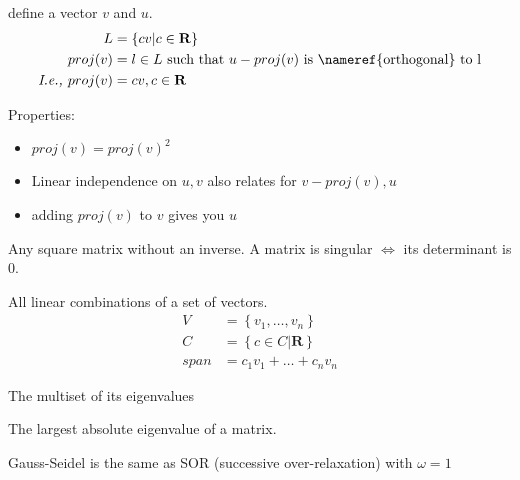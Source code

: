 \begin{definition}[Projection]
    define a vector $v$ and $u$.
    \begin{align*}
        L &= \left\{cv | c \in \mathbf{R} \right\}  \\
        proj(v) &= l \in L \text{\ such that\ } u - proj(v) 
        \text{\ is~\nameref{orthogonal} to l}  \\
        \textit{I.e., } proj(v) &= cv, c \in \mathbf{R}
    \end{align*}

    Properties:
    \begin{itemize}
        \item $proj(v) = proj(v)^{2}$
        \item Linear independence on $u, v$ also relates for $v - proj(v), u$
        \item adding $proj(v)$ to $v$ gives you $u$
    \end{itemize}

\end{definition}

\begin{definition}
    Any square matrix without an inverse.
    A matrix is singular $\iff$ its determinant is 0.

\end{definition}

\begin{definition}\label{vectorspan}
    All linear combinations of a set of vectors.
    \begin{align*}
        V &= \left\{v_{1}, \dots, v_n\right\} \\
        C &= \left\{c \in C | \mathbf{R}\right\} \\
        span &= c_{1}v_{1} + \dots + c_{n}v_{n}
    \end{align*}
\end{definition}

\begin{definition}
    The multiset of its eigenvalues
\end{definition}

\begin{definition}
    The largest absolute eigenvalue of a matrix.
\end{definition}

\begin{definition}
    Gauss-Seidel is the same as SOR (successive over-relaxation) with $\omega=1$
\end{definition}

